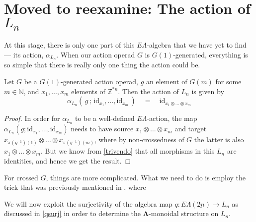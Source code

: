 \documentclass{amsbook} %
\newcommand{\id}{\textrm{id}}
\newcommand{\ML}{\mathbf{\Lambda}}
\newcommand{\ELnn}{E\Lambda(\underline{2n})}
\numberwithin{section}{chapter}
\begin{document}
\section{Moved to reexamine: The action of \texorpdfstring{$L_n$}{L_n}}



At this stage, there is only one part of this $E\Lambda$-algebra that we have yet to find --- its action, $\alpha_{L_n}$. When our action operad $G$ is $G(1)$-generated, everything is so simple that there is really only one thing the action could be.

\begin{lem} \label{G1act} Let $G$ be a $G(1)$-generated action operad, $g$ an element of $G(m)$ for some $m \in \mathbb{N}$, and $x_1, \ldots, x_m$ elements of $\mathbb{Z}^{\ast n}$. Then the action of $L_n$ is given by
\[ \alpha_{L_n}( \, g \, ; \, \id_{x_1}, \ldots, \id_{x_m} \, ) \quad = \quad \id_{x_1 \otimes \ldots \otimes x_m} \]
\end{lem}
\begin{proof}
In order for $\alpha_{L_n}$ to be a well-defined $E\Lambda$-action, the map $\alpha_{L_n}(g; \id_{x_1}, \ldots, \id_{x_m})$ needs to have source $x_1 \otimes \ldots \otimes x_m$ and target $x_{\pi(g^{-1})(1)} \otimes \ldots \otimes x_{\pi(g^{-1})(m)}$, where by non-crossedness of $G$ the latter is also $x_1 \otimes \ldots \otimes x_m$. But we know from \cref{trivendo} that all morphisms in this $L_n$ are identities, and hence we get the result.
\end{proof}

For crossed $G$, things are more complicated. What we need to do is employ the trick that was previously mentioned in , where 





We will now exploit the surjectivity of the algebra map $q \colon  \ELnn \to L_n$ as discussed in \cref{qsurj} in order to determine the $\ML$-monoidal structure on $L_n$.

\end{document}
